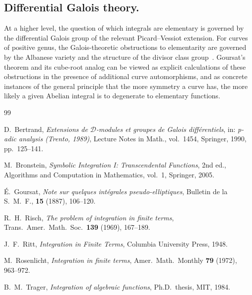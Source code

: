 \documentclass[11pt,a4paper]{article}
\theoremstyle{plain}
\theoremstyle{definition}
\theoremstyle{remark}
\begin{document}
\subsection*{Differential Galois theory.}
At a higher level, the question of which integrals are elementary is governed by the differential Galois group of the relevant Picard--Vessiot extension. For curves of positive genus, the Galois-theoretic obstructions to elementarity are governed by the Albanese variety and the structure of the divisor class group~\cite{Bertrand1990}. Goursat's theorem and its cube-root analog can be viewed as explicit calculations of these obstructions in the presence of additional curve automorphisms, and as concrete instances of the general principle that the more symmetry a curve has, the more likely a given Abelian integral is to degenerate to elementary functions.



\begin{thebibliography}{99}

D.~Bertrand,
\emph{Extensions de $\mathcal{D}$-modules et groupes de Galois diff\'erentiels},
in: \emph{p-adic analysis (Trento, 1989)}, Lecture Notes in Math., vol.~1454, Springer, 1990, pp.~125--141.

M.~Bronstein,
\emph{Symbolic Integration I: Transcendental Functions},
2nd ed., Algorithms and Computation in Mathematics, vol.~1, Springer, 2005.

\'E.~Goursat,
\emph{Note sur quelques int\'egrales pseudo-elliptiques},
Bulletin de la S.~M.~F., \textbf{15} (1887), 106--120.

R.~H.~Risch,
\emph{The problem of integration in finite terms},
Trans.\ Amer.\ Math.\ Soc.\ \textbf{139} (1969), 167--189.

J.~F.~Ritt,
\emph{Integration in Finite Terms},
Columbia University Press, 1948.

M.~Rosenlicht,
\emph{Integration in finite terms},
Amer.\ Math.\ Monthly \textbf{79} (1972), 963--972.

B.~M.~Trager,
\emph{Integration of algebraic functions},
Ph.D.\ thesis, MIT, 1984.

\end{thebibliography}
\end{document}
